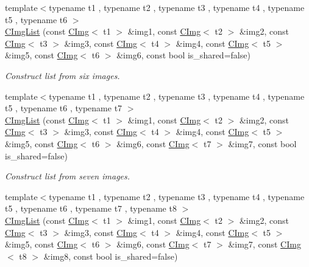 \begin{DoxyCompactItemize}
{\footnotesize template$<$typename t1 , typename t2 , typename t3 , typename t4 , typename t5 , typename t6 $>$ }\\\hyperlink{structcimg__library__suffixed_1_1CImgList_a6b020295d1a0b79fa24700733ba7bbc9}{C\+Img\+List} (const \hyperlink{structcimg__library__suffixed_1_1CImg}{C\+Img}$<$ t1 $>$ \&img1, const \hyperlink{structcimg__library__suffixed_1_1CImg}{C\+Img}$<$ t2 $>$ \&img2, const \hyperlink{structcimg__library__suffixed_1_1CImg}{C\+Img}$<$ t3 $>$ \&img3, const \hyperlink{structcimg__library__suffixed_1_1CImg}{C\+Img}$<$ t4 $>$ \&img4, const \hyperlink{structcimg__library__suffixed_1_1CImg}{C\+Img}$<$ t5 $>$ \&img5, const \hyperlink{structcimg__library__suffixed_1_1CImg}{C\+Img}$<$ t6 $>$ \&img6, const bool is\+\_\+shared=false)
\begin{DoxyCompactList}\small\item\em Construct list from six images. \end{DoxyCompactList}\item 
{\footnotesize template$<$typename t1 , typename t2 , typename t3 , typename t4 , typename t5 , typename t6 , typename t7 $>$ }\\\hyperlink{structcimg__library__suffixed_1_1CImgList_a865cdb089b9592ec803871dedd529bd3}{C\+Img\+List} (const \hyperlink{structcimg__library__suffixed_1_1CImg}{C\+Img}$<$ t1 $>$ \&img1, const \hyperlink{structcimg__library__suffixed_1_1CImg}{C\+Img}$<$ t2 $>$ \&img2, const \hyperlink{structcimg__library__suffixed_1_1CImg}{C\+Img}$<$ t3 $>$ \&img3, const \hyperlink{structcimg__library__suffixed_1_1CImg}{C\+Img}$<$ t4 $>$ \&img4, const \hyperlink{structcimg__library__suffixed_1_1CImg}{C\+Img}$<$ t5 $>$ \&img5, const \hyperlink{structcimg__library__suffixed_1_1CImg}{C\+Img}$<$ t6 $>$ \&img6, const \hyperlink{structcimg__library__suffixed_1_1CImg}{C\+Img}$<$ t7 $>$ \&img7, const bool is\+\_\+shared=false)
\begin{DoxyCompactList}\small\item\em Construct list from seven images. \end{DoxyCompactList}\item 
{\footnotesize template$<$typename t1 , typename t2 , typename t3 , typename t4 , typename t5 , typename t6 , typename t7 , typename t8 $>$ }\\\hyperlink{structcimg__library__suffixed_1_1CImgList_a36b738a02037537b70dc5b18bc13705c}{C\+Img\+List} (const \hyperlink{structcimg__library__suffixed_1_1CImg}{C\+Img}$<$ t1 $>$ \&img1, const \hyperlink{structcimg__library__suffixed_1_1CImg}{C\+Img}$<$ t2 $>$ \&img2, const \hyperlink{structcimg__library__suffixed_1_1CImg}{C\+Img}$<$ t3 $>$ \&img3, const \hyperlink{structcimg__library__suffixed_1_1CImg}{C\+Img}$<$ t4 $>$ \&img4, const \hyperlink{structcimg__library__suffixed_1_1CImg}{C\+Img}$<$ t5 $>$ \&img5, const \hyperlink{structcimg__library__suffixed_1_1CImg}{C\+Img}$<$ t6 $>$ \&img6, const \hyperlink{structcimg__library__suffixed_1_1CImg}{C\+Img}$<$ t7 $>$ \&img7, const \hyperlink{structcimg__library__suffixed_1_1CImg}{C\+Img}$<$ t8 $>$ \&img8, const bool is\+\_\+shared=false)

\end{DoxyCompactItemize}
